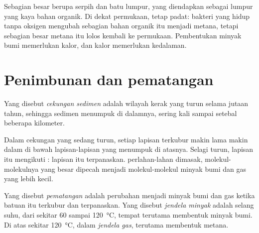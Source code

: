 Sebagian besar  berupa serpih dan batu lumpur, yang diendapkan
sebagai lumpur yang kaya bahan organik. Di dekat permukaan,  tetap
padat: bakteri yang hidup tanpa oksigen mengubah sebagian bahan organik itu
menjadi metana, tetapi sebagian besar metana itu lolos kembali ke permukaan.
Pembentukan minyak bumi memerlukan kalor, dan kalor memerlukan kedalaman.

\section{Penimbunan dan pematangan}

\begin{definition}\label{def:g11:fossil-fuel-geology:basin}
Yang disebut \emph{cekungan sedimen} adalah wilayah
kerak yang turun selama jutaan tahun, sehingga sedimen menumpuk di dalamnya,
sering kali sampai setebal beberapa kilometer.
\end{definition}

Dalam cekungan yang sedang turun, setiap lapisan terkubur makin lama makin
dalam di bawah lapisan-lapisan yang menumpuk di atasnya. Selagi turun, lapisan
itu mengikuti : lapisan itu terpanaskan.  perlahan-lahan
dimasak, molekul-molekulnya yang besar dipecah menjadi molekul-molekul
minyak bumi dan gas yang lebih kecil.

\begin{definition}\label{def:g11:fossil-fuel-geology:oil-window}
Yang disebut \emph{pematangan}  adalah perubahan
 menjadi minyak bumi dan gas ketika batuan itu terkubur dan
terpanaskan. Yang disebut \emph{jendela minyak} adalah
selang suhu, dari sekitar 60 sampai \qty{120}{\degreeCelsius}, tempat 
terutama membentuk minyak bumi. Di atas sekitar \qty{120}{\degreeCelsius},
dalam \emph{jendela gas},  terutama membentuk metana.
\end{definition}

